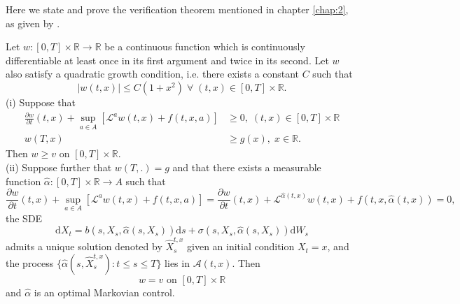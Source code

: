 Here we state and prove the verification theorem mentioned in chapter \ref{chap:2},
as given by \cite{Pham}.
\begin{theorem}
    Let $w:[0,T]\times\mathbb{R}\rightarrow\mathbb{R}$ be a continuous function which
    is continuously differentiable at least once in its first argument and twice
    in its second. Let $w$ also satisfy a quadratic growth condition, i.e. there
    exists a constant $C$ such that
    \begin{equation*}
        |w(t,x)|\leq C(1+x^2)\;\forall\;(t,x)\in[0,T]\times\mathbb{R}.
    \end{equation*}
    (i) Suppose that
    \begin{align}
        \frac{\partial w}{\partial t}(t,x)+\sup_{a\in A}[\mathcal{L}^aw(t,x)+f(t,x,a)]&\geq0,\;(t,x)\in[0,T]\times\mathbb{R}\label{eq:A.1}\\
        w(T,x)&\geq g(x),\;x\in\mathbb{R}.\label{eq:A.2}
    \end{align}
    Then $w\geq v$ on $[0,T]\times\mathbb{R}.$\\
    (ii) Suppose further that $w(T,.)=g$ and that there exists a measurable function
    $\hat{\alpha}:[0,T]\times\mathbb{R}\rightarrow A$ such that
    \begin{equation*}
        \frac{\partial w}{\partial t}(t,x)+\sup_{a\in A}[\mathcal{L}^aw(t,x)+f(t,x,a)]=\frac{\partial w}{\partial t}(t,x)+\mathcal{L}^{\hat{\alpha}(t,x)}w(t,x)+f(t,x,\hat{\alpha}(t,x))=0,
    \end{equation*}
    the SDE
    \begin{equation*}
        \mathrm dX_t=b(s,X_s,\hat{\alpha}(s,X_s))\mathrm ds+\sigma(s,X_s,\hat{\alpha}(s,X_s))\mathrm dW_s
    \end{equation*}
    admits a unique solution denoted by $\hat{X}_s^{t,x}$ given an initial condition
    $X_t=x$, and the process $\{\hat{\alpha}(s,\hat{X}_s^{t,x}):t\leq s\leq T\}$
    lies in $\mathcal{A}(t,x)$. Then
    \begin{equation}
        w=v\textrm{ on }[0,T]\times\mathbb{R}
    \end{equation}
    and $\hat{\alpha}$ is an optimal Markovian control.
\end{theorem}
